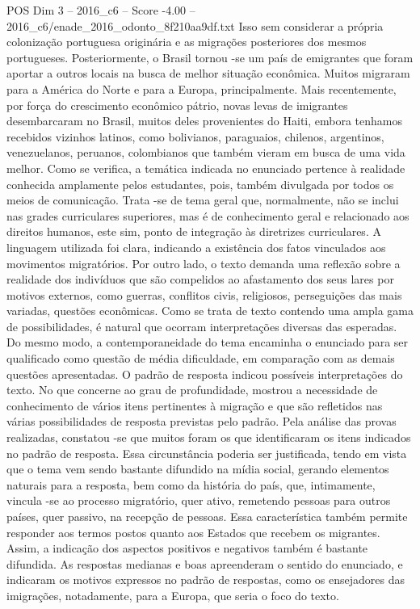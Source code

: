 \begin{textsample}{POS Dim 3 – 2016\_c6 – Score -4.00 – 2016\_c6/enade\_2016\_odonto\_8f210aa9df.txt}
Isso sem considerar a própria colonização portuguesa originária e as migrações posteriores dos mesmos portugueses.
Posteriormente, o Brasil tornou -se um país de emigrantes que foram aportar a outros locais na busca de melhor situação econômica.
Muitos migraram para a América do Norte e para a Europa, principalmente.
Mais recentemente, por força do crescimento econômico pátrio, novas levas de imigrantes desembarcaram no Brasil, muitos deles provenientes do Haiti, embora tenhamos recebidos vizinhos latinos, como bolivianos, paraguaios, chilenos, argentinos, venezuelanos, peruanos, colombianos que também vieram em busca de uma vida melhor.
Como se verifica, a temática indicada no enunciado pertence à realidade conhecida amplamente pelos estudantes, pois, também divulgada por todos os meios de comunicação.
Trata -se de tema geral que, normalmente, não se inclui nas grades curriculares superiores, mas é de conhecimento geral e relacionado aos direitos humanos, este sim, ponto de integração às diretrizes curriculares.
A linguagem utilizada foi clara, indicando a existência dos fatos vinculados aos movimentos migratórios.
Por outro lado, o texto demanda uma reflexão sobre a realidade dos indivíduos que são compelidos ao afastamento dos seus lares por motivos externos, como guerras, conflitos civis, religiosos, perseguições das mais variadas, questões econômicas.
Como se trata de texto contendo uma ampla gama de possibilidades, é natural que ocorram interpretações diversas das esperadas.
Do mesmo modo, a contemporaneidade do tema encaminha o enunciado para ser qualificado como questão de média dificuldade, em comparação com as demais questões apresentadas.
O padrão de resposta indicou possíveis interpretações do texto.
No que concerne ao grau de profundidade, mostrou a necessidade de conhecimento de vários itens pertinentes à migração e que são refletidos nas várias possibilidades de resposta previstas pelo padrão.
Pela análise das provas realizadas, constatou -se que muitos foram os que identificaram os itens indicados no padrão de resposta.
Essa circunstância poderia ser justificada, tendo em vista que o tema vem sendo bastante difundido na mídia social, gerando elementos naturais para a resposta, bem como da história do país, que, intimamente, vincula -se ao processo migratório, quer ativo, remetendo pessoas para outros países, quer passivo, na recepção de pessoas.
Essa característica também permite responder aos termos postos quanto aos Estados que recebem os migrantes.
Assim, a indicação dos aspectos positivos e negativos também é bastante difundida.
As respostas medianas e boas apreenderam o sentido do enunciado, e indicaram os motivos expressos no padrão de respostas, como os ensejadores das imigrações, notadamente, para a Europa, que seria o foco do texto.

\end{textsample}
